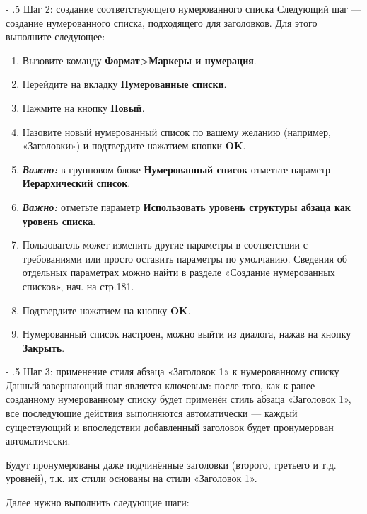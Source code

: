 ﻿\documentclass[a4paper,10pt]{article}
\makeatletter
\renewcommand\paragraph{%
   \@startsection{paragraph}{4}{0mm}%
      {-\baselineskip}%
      {.5\baselineskip}%
      {\normalfont\normalsize\bfseries}}
\makeatother
\begin{document}
 \paragraph{Шаг 2: создание соответствующего нумерованного списка}
 Следующий шаг — создание нумерованного списка, подходящего для заголовков. Для этого выполните следующее:
 \begin{enumerate}
  \item Вызовите команду \textbf{Формат>Маркеры и нумерация}.
  \item Перейдите на вкладку \textbf{Нумерованные списки}.
  \item Нажмите на кнопку \textbf{Новый}.
  \item Назовите новый нумерованный список по вашему желанию (например, «Заголовки») и подтвердите нажатием кнопки \textbf{OK}.
  \item \textbf{\textit{Важно:}} в групповом блоке \textbf{Нумерованный список} отметьте параметр \textbf{Иерархический список}.
  \item \textbf{\textit{Важно:}} отметьте параметр \textbf{Использовать уровень структуры абзаца как уровень списка}.
  \item Пользователь может изменить другие параметры в соответствии с требованиями или просто оставить параметры по умолчанию. Сведения об отдельных параметрах можно найти в разделе «Создание нумерованных списков», нач. на стр.181.
  \item Подтвердите нажатием на кнопку \textbf{OK}.
  \item Нумерованный список настроен, можно выйти из диалога, нажав на кнопку \textbf{Закрыть}.
 \end{enumerate}

\paragraph{Шаг 3: применение стиля абзаца «Заголовок 1» к нумерованному списку}
Данный завершающий шаг является ключевым: после того, как к ранее созданному нумерованному списку будет применён стиль абзаца «Заголовок 1», все последующие действия выполняются автоматически — каждый существующий и впоследствии добавленный заголовок будет пронумерован автоматически.

Будут пронумерованы даже подчинённые заголовки (второго, третьего и т.д. уровней), т.к. их стили основаны на стили «Заголовок 1».

Далее нужно выполнить следующие шаги:
\end{document}
